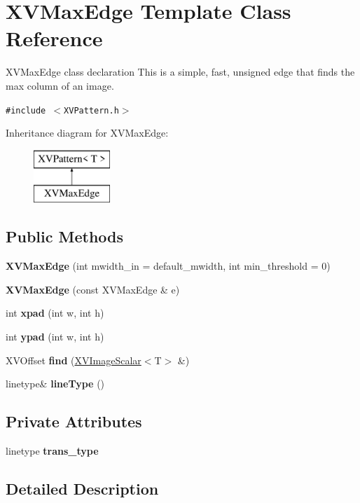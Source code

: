 \hypertarget{class_XVMaxEdge}{
\section{XVMax\-Edge  Template Class Reference}
\label{XVMaxEdge}
}
XVMax\-Edge class declaration This is a simple, fast, unsigned edge that finds the max column of an image. 


{\tt \#include $<$XVPattern.h$>$}

Inheritance diagram for XVMax\-Edge:\begin{figure}[H]
\begin{center}
\leavevmode
\includegraphics[height=2cm]{class_XVMaxEdge}
\end{center}
\end{figure}
\subsection*{Public Methods}
\begin{CompactItemize}
\item 
{\bf XVMax\-Edge} (int mwidth\_\-in = default\_\-mwidth, int min\_\-threshold = 0)
\item 
{\bf XVMax\-Edge} (const XVMax\-Edge \& e)
\item 
int {\bf xpad} (int w, int h)
\item 
int {\bf ypad} (int w, int h)
\item 
\label{XVMaxEdge_a4}
\hypertarget{class_XVMaxEdge_a4}{
XVOffset {\bf find} (\hyperlink{class_XVImageScalar}{XVImage\-Scalar}$<$T$>$ \&)}

\item 
linetype\& {\bf line\-Type} ()
\end{CompactItemize}
\subsection*{Private Attributes}
\begin{CompactItemize}
\item 
linetype {\bf trans\_\-type}
\end{CompactItemize}


\subsection{Detailed Description}
